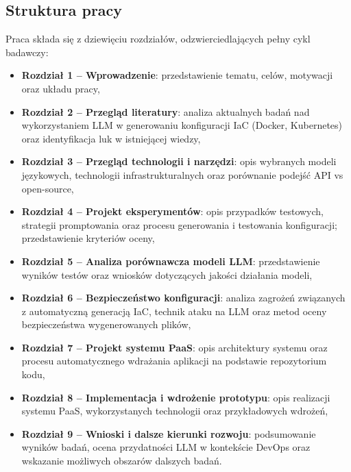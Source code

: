 \subsection{Struktura pracy}

Praca składa się z dziewięciu rozdziałów, odzwierciedlających pełny cykl badawczy:
\begin{itemize}
    \item \textbf{Rozdział 1 – Wprowadzenie}: przedstawienie tematu, celów, motywacji oraz układu pracy,
    \item \textbf{Rozdział 2 – Przegląd literatury}: analiza aktualnych badań nad wykorzystaniem LLM w generowaniu konfiguracji IaC (Docker, Kubernetes) oraz identyfikacja luk w istniejącej wiedzy,
    \item \textbf{Rozdział 3 – Przegląd technologii i narzędzi}: opis wybranych modeli językowych, technologii infrastrukturalnych oraz porównanie podejść API vs open-source,
    \item \textbf{Rozdział 4 – Projekt eksperymentów}: opis przypadków testowych, strategii promptowania oraz procesu generowania i testowania konfiguracji; przedstawienie kryteriów oceny,
    \item \textbf{Rozdział 5 – Analiza porównawcza modeli LLM}: przedstawienie wyników testów oraz wniosków dotyczących jakości działania modeli,
    \item \textbf{Rozdział 6 – Bezpieczeństwo konfiguracji}: analiza zagrożeń związanych z automatyczną generacją IaC, technik ataku na LLM oraz metod oceny bezpieczeństwa wygenerowanych plików,
    \item \textbf{Rozdział 7 – Projekt systemu PaaS}: opis architektury systemu oraz procesu automatycznego wdrażania aplikacji na podstawie repozytorium kodu,
    \item \textbf{Rozdział 8 – Implementacja i wdrożenie prototypu}: opis realizacji systemu PaaS, wykorzystanych technologii oraz przykładowych wdrożeń,
    \item \textbf{Rozdział 9 – Wnioski i dalsze kierunki rozwoju}: podsumowanie wyników badań, ocena przydatności LLM w kontekście DevOps oraz wskazanie możliwych obszarów dalszych badań.
\end{itemize}
